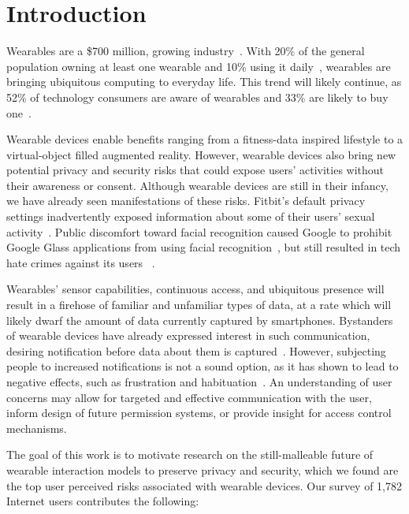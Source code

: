 \documentclass{sig-alternate-hotpets15}
\begin{document}
\section{Introduction}

Wearables are a \$700 million, growing industry~\cite{cmo}. With 20\% of the general population owning at least one wearable and 10\% using it daily~\cite{WearableStatNews}, wearables are bringing ubiquitous computing to everyday life. This trend will likely continue, as 52\% of technology consumers are aware of wearables and 33\% are likely to buy one~\cite{NPD}.  

Wearable devices enable benefits ranging from a fitness-data inspired lifestyle to a virtual-object filled augmented reality. However, wearable devices also bring new potential privacy and security risks that could expose users' activities without their awareness or consent. Although wearable devices are still in their infancy, we have already seen manifestations of these risks. Fitbit's default privacy settings inadvertently exposed information about some of their users' sexual activity~\cite{Fitbit}. Public discomfort toward facial recognition caused Google to prohibit Google Glass applications from using facial recognition~\cite{GlassDetection}, but still resulted in tech hate crimes against its users ~\cite{1_russell_2014, 16_gross_2014}. 

Wearables' sensor capabilities, continuous access, and ubiquitous presence will result in a firehose of familiar and unfamiliar types of data, at a rate which will likely dwarf the amount of data currently captured by smartphones. Bystanders of wearable devices have already expressed interest in such communication, desiring notification before data about them is captured~\cite{denning2014situ}. However, subjecting people to increased notifications is not a sound option, as it has shown to lead to negative effects, such as frustration and habituation~\cite{bohme2011security}. An understanding of user concerns may allow for targeted and effective communication with the user, inform design of future permission systems, or provide insight for access control mechanisms. 

The goal of this work is to motivate research on the still-malleable future of wearable interaction models to preserve privacy and security, which we found are the top user perceived risks associated with wearable devices.  Our survey of 1,782 Internet users contributes the following: %
\end{document}
